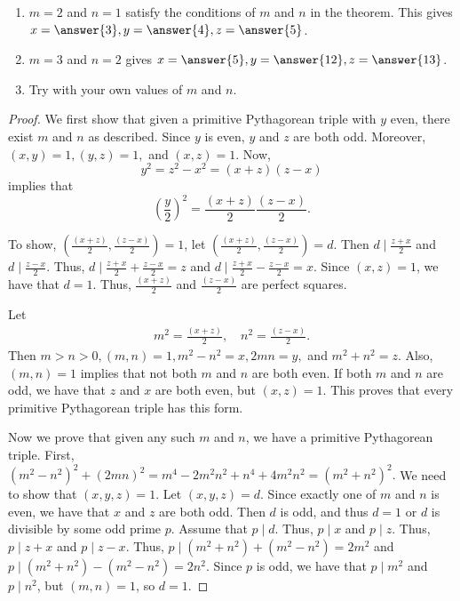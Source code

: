 \documentclass{ximera}
\begin{document}
\begin{example}
 
\begin{enumerate}
 \item $m=2$ and $n=1$ satisfy the conditions of $m$ and $n$ in the theorem. This gives $x=\answer{3}, y=\answer{4},z=\answer{5}$.
 \item $m=3$ and $n=2$ gives $x=\answer{5},y=\answer{12}, z=\answer{13}$.
 \item Try with your own values of $m$ and $n$.
\end{enumerate}
\end{example}
\begin{proof}
 We first show that given a primitive Pythagorean triple with $y$ even, there exist $m$ and $n$ as described. Since $y$ is  even, $y$ and $z$ are both odd. Moreover, $(x,y)=1,(y,z)=1,$ and $(x,z)=1$. Now,
 \[y^2=z^2-x^2=(x+z)(z-x)\] implies that \[\left(\frac{y}{2}\right)^2=\frac{(x+z)}{2}\frac{(z-x)}{2}.\] 
 
 To show, $\left(\frac{(x+z)}{2},\frac{(z-x)}{2}\right)=1$, let $\left(\frac{(x+z)}{2},\frac{(z-x)}{2}\right)=d.$ Then $d\mid\frac{z+x}{2}$ and $d\mid\frac{z-x}{2}$. Thus, $d\mid\frac{z+x}{2}+\frac{z-x}{2}=z$ and $d\mid\frac{z+x}{2}-\frac{z-x}{2}=x$. Since $(x,z)=1$, we have that $d=1$. Thus, $\frac{(x+z)}{2}$ and $\frac{(z-x)}{2}$ are perfect squares. 
 
 Let \begin{align*}m^2=\frac{(x+z)}{2},\quad n^2=\frac{(z-x)}{2}.\end{align*}
 Then $m>n>0, (m,n)=1, m^2-n^2=x, 2mn=y,$ and $m^2+n^2=z.$ Also, $(m,n)=1$ implies that not both $m$ and $n$ are both even. If both $m$ and $n$  are odd, we have that $z$ and $x$ are both even, but $(x,z)=1$. This proves that every primitive Pythagorean triple has this form.
 
 Now we prove that given any such $m$ and $n$, we have a primitive Pythagorean triple. First, $(m^2-n^2)^2+
(2mn)^2=m^4-2m^2n^2+n^4+4m^2n^2=(m^2+n^2)^2.$ We need to show that $(x,y,z)=1$. Let $(x,y,z)=d$. Since exactly one of $m$ and $n$ is even, we have that $x$ and $z$ are both odd. Then $d$ is odd, and thus $d=1$ or $d$ is divisible by some odd prime $p$. Assume that $p\mid d$. Thus, $p\mid x$ and $p\mid z$. Thus, $p\mid z+x$ and $p\mid z-x$. Thus, $p\mid (m^2+n^2)+(m^2-n^2)=2m^2$ and $p\mid (m^2+n^2)-(m^2-n^2)=2n^2.$ Since $p$ is odd, we have that $p\mid m^2$ and $p\mid n^2$, but  $(m,n)=1$, so $d=1$.
\end{proof}
\end{document}
